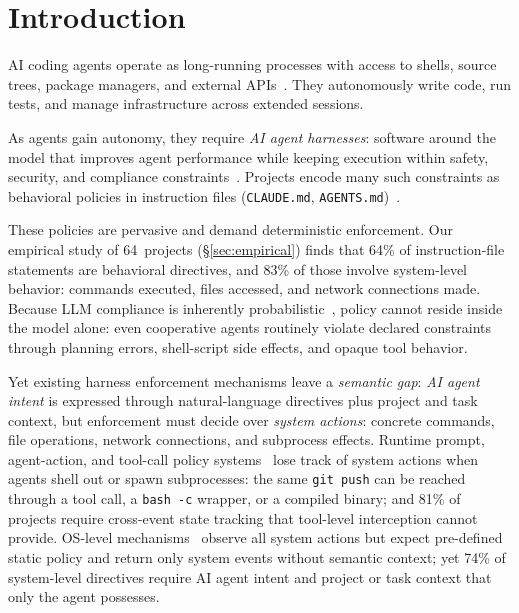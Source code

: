 \section{Introduction}

AI coding agents operate as long-running processes with access to shells,
source trees, package managers, and external APIs~\cite{agentsight}. They
autonomously write code, run tests, and manage infrastructure across
extended sessions.

As agents gain autonomy, they require \emph{AI agent harnesses}: software
around the model that improves agent performance while keeping execution
within safety, security, and compliance
constraints~\cite{langchain-harness,fowler-harness}. Projects encode many
such constraints as behavioral policies in instruction files
(\texttt{CLAUDE.md},
\texttt{AGENTS.md})~\cite{chatlatanagulchai2025manifests,lulla2026agentsmd}.

These policies are pervasive and demand deterministic enforcement. Our
empirical study of 64~projects (\S\ref{sec:empirical}) finds that 64\%
of instruction-file statements are behavioral directives, and 83\% of
those involve system-level behavior: commands executed, files accessed,
and network connections made. Because LLM compliance is inherently
probabilistic~\cite{liu2024lost}, policy cannot reside inside the model
alone: even cooperative agents routinely violate declared constraints
through planning errors, shell-script side effects, and opaque tool
behavior.

Yet existing harness enforcement mechanisms leave a \emph{semantic gap}:
\emph{AI agent intent} is expressed through natural-language directives
plus project and task context, but enforcement must decide over
\emph{system actions}: concrete commands, file operations, network
connections, and subprocess effects. Runtime prompt, agent-action, and
tool-call policy systems~\cite{rebedea2023nemo,xiang2025guardagent,wang2025agentspec}
lose track of system actions when agents shell out or spawn subprocesses: the
same \texttt{git~push} can be reached through a tool call, a
\texttt{bash~-c} wrapper, or a compiled binary; and 81\% of projects
require cross-event state tracking that tool-level interception cannot
provide. OS-level
mechanisms~\cite{ciliumtetragon,flume,pasquier2018camquery} observe all
system actions but expect pre-defined static policy and return only
system events without semantic context; yet 74\% of system-level directives
require AI agent intent and project or task context that only the agent
possesses.

